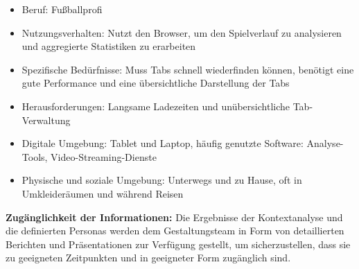 \begin{enumerate}
\begin{itemize}
        \item Beruf: Fußballprofi
        \item Nutzungsverhalten: Nutzt den Browser, um den Spielverlauf zu analysieren und aggregierte Statistiken zu erarbeiten
        \item Spezifische Bedürfnisse: Muss Tabs schnell wiederfinden können, benötigt eine gute Performance und eine übersichtliche Darstellung der Tabs
        \item Herausforderungen: Langsame Ladezeiten und unübersichtliche Tab-Verwaltung
        \item Digitale Umgebung: Tablet und Laptop, häufig genutzte Software: Analyse-Tools, Video-Streaming-Dienste
        \item Physische und soziale Umgebung: Unterwegs und zu Hause, oft in Umkleideräumen und während Reisen
    \end{itemize}
\end{enumerate}

\textbf{Zugänglichkeit der Informationen:}
Die Ergebnisse der Kontextanalyse und die definierten Personas werden dem Gestaltungsteam in Form von detaillierten Berichten und Präsentationen zur Verfügung gestellt, um sicherzustellen, dass sie zu geeigneten Zeitpunkten und in geeigneter Form zugänglich sind.

